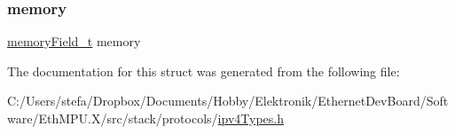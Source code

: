 \mbox{\label{structipv4__packet__t_ad8f3b87ff206655025f5734f21bce6e7}} 
\subsubsection{\texorpdfstring{memory}{memory}}
{\footnotesize\ttfamily \mbox{\hyperlink{structmemory_field__t}{memory\+Field\+\_\+t}} memory}



The documentation for this struct was generated from the following file\+:\begin{DoxyCompactItemize}
\item 
C\+:/\+Users/stefa/\+Dropbox/\+Documents/\+Hobby/\+Elektronik/\+Ethernet\+Dev\+Board/\+Software/\+Eth\+M\+P\+U.\+X/src/stack/protocols/\mbox{\hyperlink{ipv4_types_8h}{ipv4\+Types.\+h}}\end{DoxyCompactItemize}
